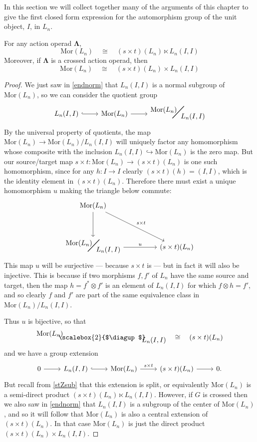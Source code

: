 \documentclass{amsbook} %
\newcommand{\ML}{\mathbf{\Lambda}}
\newcommand{\MorLn}{\mathrm{Mor}(L_n)}
\newcommand{\bigquotient}[2]{ \raisebox{0.75\height}{$#1$} \mkern-12mu\scalebox{2}{$\diagup$}\mkern-10mu \raisebox{-0.5\height}{$#2$} }
\numberwithin{section}{chapter}
\begin{document}
In this section we will collect together many of the arguments of this chapter to give the first closed form expression for the automorphism group of the unit object, $I$, in $L_n$.
\begin{prop} \label{morprod} For any action operad $\ML$,
\[ \MorLn \quad \cong \quad (s \times t)(L_n) \ltimes L_n(I,I) \]
Moreover, if $\ML$ is a crossed action operad, then
\[ \MorLn \quad \cong \quad (s \times t)(L_n) \times L_n(I,I) \]
\end{prop}
\begin{proof}
We just saw in \cref{endnorm} that $L_n(I,I)$ is a normal subgroup of $\MorLn$, so we can consider the quotient group
\[ \begin{tikzcd}
L_n(I,I) \ar[r, hookrightarrow] & \MorLn \ar[r] & \bigquotient{\MorLn}{L_n(I,I)}
\end{tikzcd} \]
By the universal property of quotients, the map $\MorLn \to \MorLn / L_n(I,I)$ will uniquely factor any homomorphism whose composite with the inclusion $L_n(I,I) \hookrightarrow \MorLn$ is the zero map. But our source/target map $s \times t \colon \MorLn \to (s \times t)(L_n)$ is one such homomorphism, since for any $h \colon  I \to I$ clearly $(s \times t)(h) = (I, I)$, which is the identity element in $(s \times t)(L_n)$. Therefore there must exist a unique homomorphism $u$ making the triangle below commute:
\[ \begin{tikzcd}
\MorLn \ar[dd] \ar[ddrr, "s \times t"] & & \\
& & \\
\bigquotient{\MorLn}{L_n(I,I)} \ar[rr, "u"] & & (s \times t)(L_n)
\end{tikzcd} \]
This map $u$ will be surjective --- because $s \times t$ is --- but in fact it will also be injective. This is because if two morphisms $f, f'$ of $L_n$ have the same source and target, then the map $h = f^* \otimes f'$ is an element of $L_n(I,I)$ for which $f \otimes h = f'$, and so clearly $f$ and $f'$ are part of the same equivalence class in $\MorLn/L_n(I,I)$. 

Thus $u$ is bijective, so that
\[ \bigquotient{\MorLn}{L_n(I,I)} \quad \cong \quad (s \times t)(L_n) \]
and we have a group extension
\[ \begin{tikzcd}
0 \ar[r] & L_n(I,I) \ar[r, hookrightarrow] & \MorLn \ar[r, "s \times t"] & (s \times t)(L_n) \ar[r] & 0.
\end{tikzcd} \]
But recall from \cref{stZsub} that this extension is split, or equivalently $\MorLn$ is a semi-direct product $(s \times t)(L_n) \ltimes L_n(I,I)$. However, if $G$ is crossed then we also saw in \cref{endnorm} that $L_n(I,I)$ is a subgroup of the center of $\MorLn$, and so it will follow that $\MorLn$ is also a central extension of $(s \times t)(L_n)$. In that case $\MorLn$ is just the direct product $(s \times t)(L_n) \times L_n(I,I)$.
\end{proof}
\end{document}

